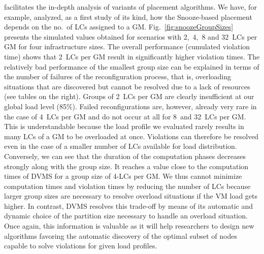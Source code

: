 \vmps facilitates the in-depth analysis of variants of placement
algorithms. We have, for example, analyzed, as a first study of its
kind, how the Snooze-based placement depends on the no.\ of LCs
assigned to a GM. Fig.~\ref{fig:snoozeGroupSizes} presents the
simulated values obtained for scenarios with 2,~4,~8 and 32~LCs per GM
for four infrastructure sizes. The overall performance (\ie cumulated
violation time) shows that 2~LCs per GM result in significantly higher
violation times.
The relatively bad performance of the smallest group size can be
explained in terms of the number of failures of the reconfiguration
process, that is, overloading situations that are discovered but
cannot be resolved
due to a lack of resources (see tables on the right).  Groups of 2~LCs
per GM are clearly insufficient at our global load level (85\%).
Failed reconfigurations are, however, already very rare in the case of
4~LCs per GM and do not occur at all for 8~and 32~LCs per GM. This is
understandable because
the load profile we evaluated rarely results in many LCs of a GM to be
overloaded at once. Violations can therefore be resolved even in the
case of a smaller number of LCs available for load distribution.
Conversely, we can see that the duration of the computation phases
decreases strongly along with the group size. It reaches a value close
to the computation times of DVMS for a group size of 4-LCs per
GM.%
We thus cannot minimize computation times and violation times by
reducing the number of LCs because larger group sizes are necessary to
resolve overload situations if the VM load gets higher.  In contrast,
DVMS resolves this trade-off by means of its automatic and dynamic
choice of the partition size necessary to handle an overload
situation.  Once again, this information is valuable as it will help
researchers to design new algorithms favoring the automatic discovery
of the optimal subset of nodes capable to solve violations for given
load profiles.


